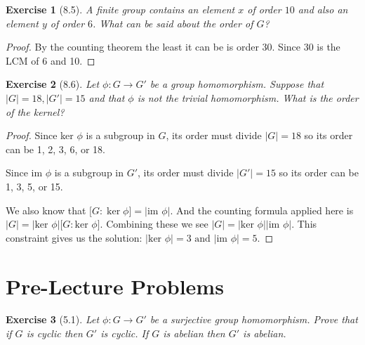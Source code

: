 \documentclass[12pt,leqno]{article}
\numberwithin{equation}{section}
\newtheorem*{exer}{Exercise}
\theoremstyle{definition}
\begin{document}
\begin{exer}[8.5] A finite group contains an element $x$ of order $10$ and also
    an element $y$ of order $6$. What can be said about the order of $G$? 

\end{exer}

\begin{proof}[Proof]

    By the counting theorem the least it can be is order 30. Since 30 is the
    LCM of 6 and 10.

\end{proof}

\begin{exer}[8.6] Let $\phi:G \rightarrow G'$ be a group homomorphism. Suppose
    that $|G|=18, |G'|=15$ and that $\phi$ is not the trivial homomorphism.
    What is the order of the kernel?

\end{exer}

\begin{proof}[Proof]
    
    Since ker $\phi$ is a subgroup in $G$, its order must divide $\vert G \vert = 18$ so its 
    order can be 1, 2, 3, 6, or 18. 

    Since im $\phi$ is a subgroup in $G'$, its order must divide $\vert G' \vert = 15$ so its
    order can be 1, 3, 5, or 15.

    We also know that $\lbrack G : \ker \phi] = \vert \text{im } \phi \vert$.
    And the counting formula applied here is $\vert G \vert = \vert \text{ker }
    \phi \vert \lbrack G : \text{ker } \phi \rbrack$.  Combining these we see
    $\vert G \vert = \vert \text{ker } \phi \vert \vert \text{im } \phi \vert$.
    This constraint gives us the solution: $\vert \text{ker } \phi \vert = 3
    \text{ and } \vert \text{im } \phi \vert = 5$.

\end{proof}

\section*{Pre-Lecture Problems}
\begin{exer}[5.1]  Let $\phi:G \rightarrow G'$ be a surjective group homomorphism. Prove that if $G$ is cyclic then $G'$ is cyclic. If $G$ is abelian then $G'$ is abelian.
\end{exer}
\end{document}
